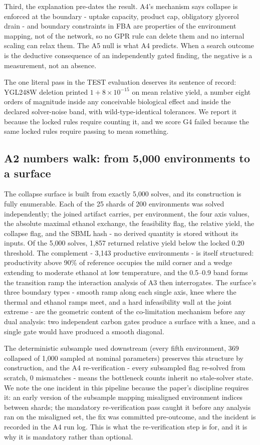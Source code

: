\documentclass[12pt]{article}
\begin{document}
Third, the explanation pre-dates the result. A4's mechanism says
collapse is enforced at the boundary - uptake capacity, product cap,
obligatory glycerol drain - and boundary constraints in FBA are
properties of the environment mapping, not of the network, so no GPR
rule can delete them and no internal scaling can relax them. The A5
null is what A4 predicts. When a search outcome is the deductive
consequence of an independently gated finding, the negative is a
measurement, not an absence.

The one literal pass in the TEST evaluation deserves its sentence of
record: YGL248W deletion printed $1+8\times10^{-15}$ on mean relative
yield, a number eight orders of magnitude inside any conceivable
biological effect and inside the declared solver-noise band, with
wild-type-identical tolerances. We report it because the locked rules
require counting it, and we score G4 failed because the same locked
rules require passing to mean something.



\subsection{A2 numbers walk: from 5{,}000 environments to a surface}

The collapse surface is built from exactly 5{,}000 solves, and its
construction is fully enumerable. Each of the 25 shards of 200
environments was solved independently; the joined artifact carries,
per environment, the four axis values, the absolute maximal ethanol
exchange, the feasibility flag, the relative yield, the collapse
flag, and the SBML hash - no derived quantity is stored without its
inputs. Of the 5{,}000 solves, 1{,}857 returned relative yield below
the locked 0.20 threshold. The complement - 3{,}143 productive
environments - is itself structured: productivity above 90\% of
reference occupies the mild corner and a wedge extending to moderate
ethanol at low temperature, and the 0.5--0.9 band forms the
transition ramp the interaction analysis of A3 then interrogates.
The surface's three boundary types - smooth ramp along each single
axis, knee where the thermal and ethanol ramps meet, and a hard
infeasibility wall at the joint extreme - are the geometric content
of the co-limitation mechanism before any dual analysis: two
independent carbon gates produce a surface with a knee, and a single
gate would have produced a smooth diagonal.

The deterministic subsample used downstream (every fifth environment,
369 collapsed of 1{,}000 sampled at nominal parameters) preserves
this structure by construction, and the A4 re-verification - every
subsampled flag re-solved from scratch, 0 mismatches - means the
bottleneck counts inherit no stale-solver state. We note the one
incident in this pipeline because the paper's discipline requires
it: an early version of the subsample mapping misaligned environment
indices between shards; the mandatory re-verification pass caught it
before any analysis ran on the misaligned set, the fix was committed
pre-outcome, and the incident is recorded in the A4 run log. This is
what the re-verification step is for, and it is why it is mandatory
rather than optional.
\end{document}
